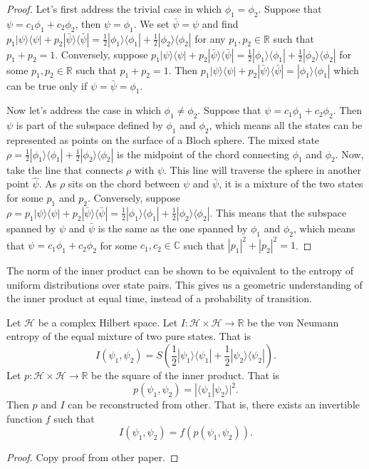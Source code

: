\documentclass[10pt,twocolumn, nofootinbib]{revtex4-2}
\def\>{\rangle}
\def\<{\langle}
\begin{document}
\begin{proof}
	Let's first address the trivial case in which $\phi_1 = \phi_2$. Suppose that $\psi = c_1 \phi_1 + c_2 \phi_2$, then $\psi = \phi_1$. We set $\bar{\psi} = \psi$ and find $p_1|\psi\>\<\psi| + p_2|\bar{\psi}\>\<\bar{\psi}| = \frac{1}{2}|\phi_1\>\<\phi_1| + \frac{1}{2}|\phi_2\>\<\phi_2|$ for any $p_1, p_2 \in \mathbb{R}$ such that $p_1+p_2=1$. Conversely, suppose $p_1|\psi\>\<\psi| + p_2|\bar{\psi}\>\<\bar{\psi}| = \frac{1}{2}|\phi_1\>\<\phi_1| + \frac{1}{2}|\phi_2\>\<\phi_2|$ for some $p_1, p_2 \in \mathbb{R}$ such that $p_1+p_2=1$. Then $p_1|\psi\>\<\psi| + p_2|\bar{\psi}\>\<\bar{\psi}| = |\phi_1\>\<\phi_1|$ which can be true only if $\psi=\bar{\psi}=\phi_1$.
	
	Now let's address the case in which $\phi_1 \neq \phi_2$. Suppose that $\psi = c_1 \phi_1 + c_2 \phi_2$. Then $\psi$ is part of the subspace defined by $\phi_1$ and $\phi_2$, which means all the states can be represented as points on the surface of a Bloch sphere. The mixed state $\rho=\frac{1}{2}|\phi_1\>\<\phi_1| + \frac{1}{2}|\phi_2\>\<\phi_2|$ is the midpoint of the chord connecting $\phi_1$ and $\phi_2$. Now, take the line that connects $\rho$ with $\psi$. This line will traverse the sphere in another point $\hat{\psi}$. As $\rho$ sits on the chord between $\psi$ and $\bar{\psi}$, it is a mixture of the two states for some $p_1$ and $p_2$. Conversely, suppose $\rho = p_1|\psi\>\<\psi| + p_2|\bar{\psi}\>\<\bar{\psi}| = \frac{1}{2}|\phi_1\>\<\phi_1| + \frac{1}{2}|\phi_2\>\<\phi_2|$. This means that the subspace spanned by $\psi$ and $\bar{\psi}$ is the same as the one spanned by $\phi_1$ and $\phi_2$, which means that $\psi = c_1 \phi_1 + c_2 \phi_2$ for some $c_1, c_2 \in \mathbb{C}$ such that $|p_1|^2+|p_2|^2=1$.
\end{proof}

The norm of the inner product can be shown to be equivalent to the entropy of uniform distributions over state pairs. This gives us a geometric understanding of the inner product at equal time, instead of a probability of transition.

\begin{prop}
Let $\mathcal{H}$ be a complex Hilbert space. Let $I : \mathcal{H} \times \mathcal{H} \to \mathbb{R}$ be the von Neumann entropy of the equal mixture of two pure states. That is
\begin{equation}
	I(\psi_1, \psi_2) = S\left(\frac{1}{2}|\psi_1\>\<\psi_1| + \frac{1}{2}|\psi_2\>\<\psi_2|\right).
\end{equation}
Let $p :  \mathcal{H} \times \mathcal{H} \to \mathbb{R}$ be the square of the inner product. That is
\begin{equation}
	p(\psi_1, \psi_2) = |\<\psi_1| \psi_2\>|^2.
\end{equation}
Then $p$ and $I$ can be reconstructed from other. That is, there exists an invertible function $f$ such that
\begin{equation}
	I(\psi_1, \psi_2) = f(p(\psi_1, \psi_2)).
\end{equation}
\end{prop}

\begin{proof}
	Copy proof from other paper.
\end{proof}
\end{document}
